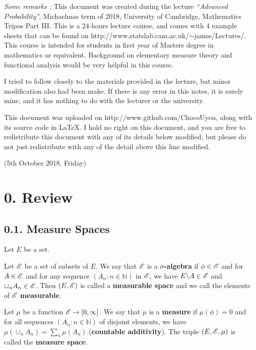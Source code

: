 \documentclass[12pt,a4paper]{report}
\begin{document}
\begin{changemargin}{1.5cm}{1.5cm}
\textit{Some remarks :} This document was created during the lecture \textit{``Advanced Probability"}, Michaelmas term of 2018, University of Cambridge, Mathematics Tripos Part III. This is a 24-hours lecture course, and comes with 4 example sheets that can be found on http://www.statslab.cam.ac.uk/$\sim$james/Lectures/. This course is intended for students in first year of Masters degree in mathematics or equivalent. Background on elementary measure theory and functional analysis would be very helpful in this course.
\s

I tried to follow closely to the materials provided in the lecture, but minor modification also had been make. If there is any error in this notes, it is surely mine, and it has nothing to do with the lecturer or the university.
\s

This document was uploaded on http://www.github.com/ChocoUyou, along with its source code in \LaTeX. I hold no right on this document, and you are free to redistribute this document with any of its details below modified, but please do not just redistribute with any of the detail above this line modified.
\end{changemargin}

\newpage

\newday

(5th October 2018, Friday)

\section*{0. Review}

\subsection*{0.1. Measure Spaces}

Let $E$ be a set.
\s

Let $\mathscr{E}$ be a set of subsets of $E$. We say that $\mathscr{E}$ is a \textbf{$\sigma$-algebra} if $\phi \in \mathscr{E}$ and for $A \in \mathscr{E}$ and for any sequence $(A_n : n\in \mathbb{N})$ in $\mathscr{E}$, we have $E\backslash A \in \mathscr{E}$ and $\cup_n A_n \in \mathscr{E}$. Then $(E,\mathscr{E})$ is called a \textbf{measurable space} and we call the elements of $\mathscr{E}$ \textbf{measurable}.
\s

Let $\mu$ be a function $\mathscr{E} \rightarrow [0,\infty]$. We say that $\mu$ is a \textbf{measure} if $\mu(\phi)=0$ and for all sequences $(A_n : n\in \mathbb{N})$ of disjoint elements, we have $\mu(\cup_n A_n) = \sum_n \mu(A_n)$.(\textbf{countable additivity}). The triple $(E,\mathscr{E}, \mu)$ is called the \textbf{measure space}. 
\s
\end{document}
